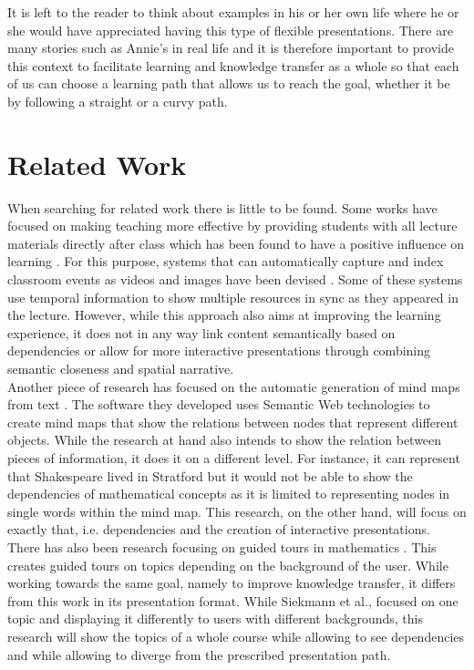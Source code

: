 \documentclass[twoside, 12pt]{article}
\begin{document}
It is left to the reader to think about examples in his or her own life where he or she would have appreciated having this type of flexible presentations. There are many stories such as Annie's in real life and it is therefore important to provide this context to facilitate learning and knowledge transfer as a whole so that each of us can choose a learning path that allows us to reach the goal, whether it be by following a straight or a curvy path.

\section{Related Work}
\label{sec:relatedworks}

When searching for related work there is little to be found. Some works have focused on making teaching more effective by providing students with all lecture materials directly after class which has been found to have a positive influence on learning \cite{DBLP:dblp_journals/tochi/BrothertonA04}. For this purpose, systems that can automatically capture and index classroom events as videos and images have been devised \cite{indexedclass:npentrel14}. Some of these systems use temporal information \cite{DBLP:dblp_journals/isci/ChungS97} to show multiple resources in sync as they appeared in the lecture. However, while this approach also aims at improving the learning experience, it does not in any way link content semantically based on dependencies or allow for more interactive presentations through combining semantic closeness and spatial narrative.\\

Another piece of research has focused on the automatic generation of mind maps from text \cite{abdeen2009direct}. The software they developed uses Semantic Web technologies to create mind maps that show the relations between nodes that represent different objects. While the research at hand also intends to show the relation between pieces of information, it does it on a different level. For instance, it can represent that Shakespeare lived in Stratford but it would not be able to show the dependencies of mathematical concepts as it is limited to representing nodes in single words within the mind map. This research, on the other hand, will focus on exactly that, i.e. dependencies and the creation of interactive presentations.\\

There has also been research focusing on guided tours in mathematics \cite{SieBen:acgap00}. This creates guided tours on topics depending on the background of the user. While working towards the same goal, namely to improve knowledge transfer, it differs from this work in its presentation format. While Siekmann et al., focused on one topic and displaying it differently to users with different backgrounds, this research will show the topics of a whole course while allowing to see dependencies and while allowing to diverge from the prescribed presentation path.\\
\end{document}
